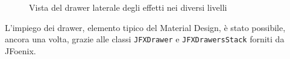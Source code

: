 \begin{figure}[htbp]
{                }%
                \qquad{\LARGE$\Rightarrow$}\qquad
                \caption{Vista del drawer laterale degli effetti nei diversi livelli\label{fig:impl:allEffects}}
            \end{figure}


            L'impiego dei drawer, elemento tipico del Material Design, è stato possibile, ancora una volta, grazie alle classi \texttt{JFXDrawer} e \texttt{JFXDrawersStack} forniti da JFoenix.

